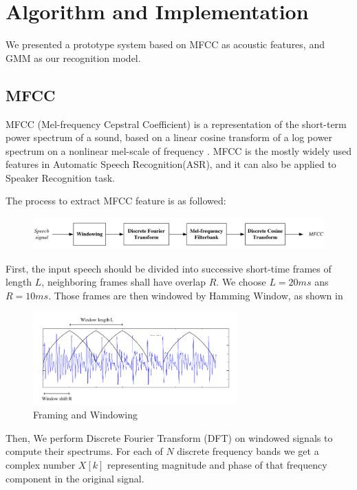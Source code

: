 
\section{Algorithm and Implementation}

We presented a prototype system based on MFCC as acoustic features, and
GMM as our recognition model.

\subsection{MFCC}
MFCC (Mel-frequency Cepstral Coefficient) is a representation of the short-term power spectrum of a sound,
based on a linear cosine transform of a log
power spectrum on a nonlinear mel-scale of frequency \cite{mfcc} .
MFCC is the mostly widely used features in Automatic Speech Recognition(ASR), and it can also be
applied to Speaker Recognition task.

The process to extract MFCC feature is as followed:
\begin{figure}[H]
  \centering
  \includegraphics[width=\textwidth]{res/MFCC.png}
\end{figure}

First, the input speech should be divided into successive short-time frames of length $L$,
neighboring frames shall have overlap $R$. We choose $L = 20ms  $ ans $ R = 10 ms$.
Those frames are then windowed by Hamming Window, as shown in 
\begin{figure}[H]
  \centering
  \includegraphics[width=0.7\textwidth]{res/frames.png}
  \caption{Framing and Windowing \label{fig:framming}}
\end{figure}

Then, We perform Discrete Fourier Transform (DFT) on windowed signals to compute their spectrums.
For each of $N$ discrete frequency bands we get a complex number $X[k]$ representing
magnitude and phase of that frequency component in the original signal.

